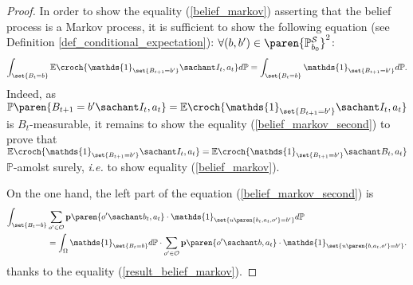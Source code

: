 \begin{proof}
In order to show the equality (\ref{belief_markov}) asserting that the belief process is a Markov process, 
it is sufficient to show the following equation (see Definition \ref{def_conditional_expectation}): 
$\forall (b,b') \in \paren{\mathbb{P}^{\mathcal{S}}_{b_0}}^2$: 
\begin{equation} 
\label{belief_markov_second}
\int_{ \set{B_t = b} } \mathbb{E} \croch{ \mathds{1}_{\set{ B_{t+1} = b' }} \sachant I_t, a_t }  d \mathbb{P} = \int_{ \set{B_t = b} } \mathds{1}_{\set{ B_{t+1} = b'}}  d \mathbb{P}. 
\end{equation}
Indeed, as $\mathbb{P} \paren{ B_{t+1} = b' \sachant I_t, a_t  } = \mathbb{E} \croch{ \mathds{1}_{\set{ B_{t+1} = b' }} \sachant I_t, a_t } $ is $B_t$-measurable,
it remains to show the equality (\ref{belief_markov_second}) 
to prove that $\mathbb{E} \croch{ \mathds{1}_{\set{ B_{t+1} = b' }} \sachant I_t, a_t } = \mathbb{E} \croch{ \mathds{1}_{\set{ B_{t+1} = b' }} \sachant B_t, a_t }$ $\mathbb{P}$-amolst surely, \textit{i.e.} to show equality (\ref{belief_markov}).

On the one hand, the left part of the equation (\ref{belief_markov_second}) is
\begin{align} 
\nonumber\int_{ \set{B_t = b} }& \sum_{o' \in \mathcal{O}} \textbf{p} \paren{ o' \sachant b_t, a_t } \cdot \mathds{1}_{ \set{ u \paren{ b_t, a_t, o'} = b'} } d \mathbb{P} \\
\label{belief_markov_l} &= \int_{ \Omega } \mathds{1}_{\set{B_t = b}} d \mathbb{P} \cdot \sum_{o' \in \mathcal{O}} \textbf{p} \paren{ o' \sachant b, a_t } \cdot \mathds{1}_{ \set{ u \paren{ b, a_t, o'} = b'} }.
\end{align}
thanks to the equality (\ref{result_belief_markov}).


\end{proof}
